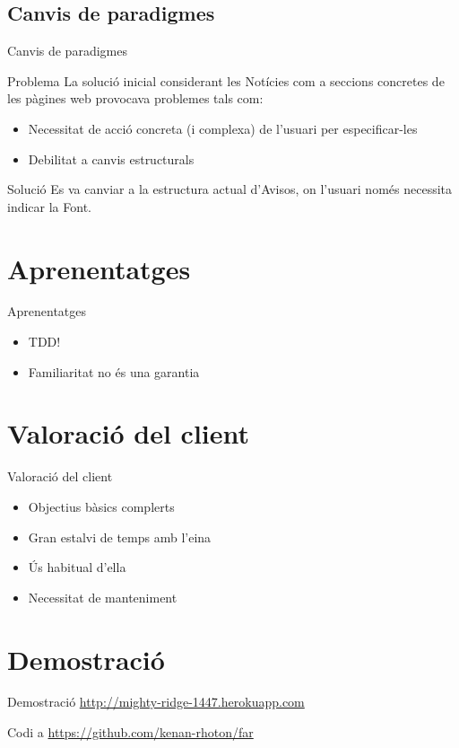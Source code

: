 \documentclass{beamer}
\begin{document}
\subsection{Canvis de paradigmes}

\begin{frame}{Canvis de paradigmes}
    \begin{alertblock}{Problema}
        La solució inicial considerant les Notícies com a seccions concretes de les pàgines web provocava problemes tals com:
        \begin{itemize}
            \item Necessitat de acció concreta (i complexa) de l'usuari per especificar-les
            \item Debilitat a canvis estructurals
        \end{itemize}
    \end{alertblock}
    \pause{}
    \begin{exampleblock}{Solució}
        Es va canviar a la estructura actual d'Avisos, on l'usuari només necessita indicar la Font.
    \end{exampleblock}
\end{frame}

\section{Aprenentatges}

\begin{frame}{Aprenentatges}
    \begin{itemize}
        \item TDD\@!
        \item Familiaritat no és una garantia
    \end{itemize}
\end{frame}

\section{Valoració del client}

\begin{frame}{Valoració del client}
    \begin{itemize}
        \item Objectius bàsics complerts
        \item Gran estalvi de temps amb l'eina
        \item Ús habitual d'ella
        \item Necessitat de manteniment
    \end{itemize}
\end{frame}

\section{Demostració}
\begin{frame}{Demostració}
    \url{http://mighty-ridge-1447.herokuapp.com}

    Codi a \url{https://github.com/kenan-rhoton/far}
\end{frame}
\end{document}
